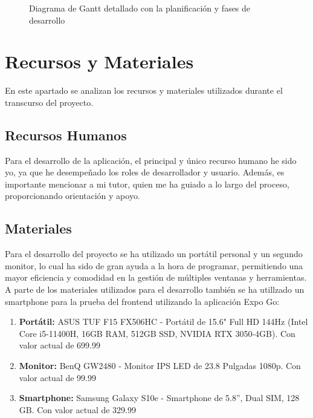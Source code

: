 \begin{figure}[H]
{\begin{ganttchart}
        \end{ganttchart}
    }
    \caption{Diagrama de Gantt detallado con la planificación y fases de desarrollo}
    \label{fig:gantt_diagram_detailed}
\end{figure}




\section{Recursos y Materiales}

En este apartado se analizan los recursos y materiales utilizados durante el transcurso del proyecto.

\subsection{Recursos Humanos}

Para el desarrollo de la aplicación, el principal y único recurso humano he sido yo, ya que he desempeñado los roles de desarrollador y usuario. Además, es importante mencionar a mi tutor, quien me ha guiado a lo largo del proceso, proporcionando orientación y apoyo.

\subsection{Materiales}

Para el desarrollo del proyecto se ha utilizado un portátil personal y un segundo monitor, lo cual ha sido de gran ayuda a la hora de programar, permitiendo una mayor eficiencia y comodidad en la gestión de múltiples ventanas y herramientas. A parte de los materiales utilizados para el desarrollo también se ha utillzado un smartphone para la prueba del frontend utilizando la aplicación Expo Go:

\begin{enumerate}
    \item \textbf{Portátil:} ASUS TUF F15 FX506HC - Portátil de 15.6" Full HD 144Hz (Intel Core i5-11400H, 16GB RAM, 512GB SSD, NVIDIA RTX 3050-4GB). Con valor actual de 699.99 \EUR{} \cite{amazon_asus}

    \item \textbf{Monitor:} BenQ GW2480 - Monitor IPS LED de 23.8 Pulgadas 1080p. Con valor actual de 99.99 \EUR{} \cite{amazon_samsung}

    \item \textbf{Smartphone:} Samsung Galaxy S10e - Smartphone de 5.8”, Dual SIM, 128 GB. Con valor actual de 329.99 \EUR{} \cite{amazon_benq}
\end{enumerate}


